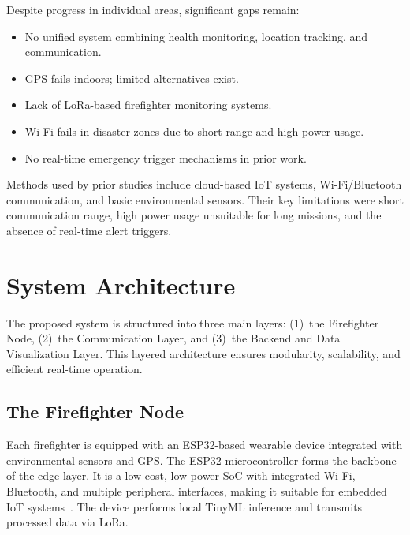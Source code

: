 \documentclass[conference]{IEEEtran}
\begin{document}
	Despite progress in individual areas, significant gaps remain:
	\begin{itemize}
		\item No unified system combining health monitoring, location tracking,
		and communication.
		\item GPS fails indoors; limited alternatives exist.
		\item Lack of LoRa-based firefighter monitoring systems.
		\item Wi-Fi fails in disaster zones due to short range and high power usage.
		\item No real-time emergency trigger mechanisms in prior work.
	\end{itemize}
	
	Methods used by prior studies include cloud-based IoT systems, Wi-Fi/Bluetooth
	communication, and basic environmental sensors. Their key limitations were short
	communication range, high power usage unsuitable for long missions, and the
	absence of real-time alert triggers.
	
	\section{System Architecture}
	
	The proposed system is structured into three main layers: (1)~the Firefighter
	Node, (2)~the Communication Layer, and (3)~the Backend and Data Visualization
	Layer. This layered architecture ensures modularity, scalability, and efficient
	real-time operation.
	
	\subsection{The Firefighter Node}
	
	Each firefighter is equipped with an ESP32-based wearable device integrated
	with environmental sensors and GPS. The ESP32 microcontroller forms the backbone
	of the edge layer. It is a low-cost, low-power SoC with integrated Wi-Fi,
	Bluetooth, and multiple peripheral interfaces, making it suitable for embedded
	IoT systems~\cite{yadav2026}. The device performs local TinyML inference and
	transmits processed data via LoRa.
	
\end{document}
